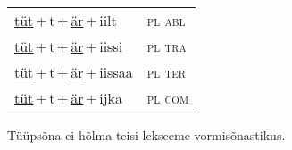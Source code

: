 \begin{minipage}{\textwidth}
\begin{sideways}
\begin{tabular}{l l}
\underline{tüt}\,+\,t\,+\,\underline{är}\,+\,iilt & \textsc{ pl abl } \\
\underline{tüt}\,+\,t\,+\,\underline{är}\,+\,iissi & \textsc{ pl tra } \\
\underline{tüt}\,+\,t\,+\,\underline{är}\,+\,iissaa & \textsc{ pl ter } \\
\underline{tüt}\,+\,t\,+\,\underline{är}\,+\,ijka & \textsc{ pl com } \\
\end{tabular}
\end{sideways}
\label{tab:tüüpsõnamall-tütär}

\end{minipage}

 
\vspace{1em}
\noindent Tüüpsõna ei hõlma teisi lekseeme vormi\-sõnastikus.
